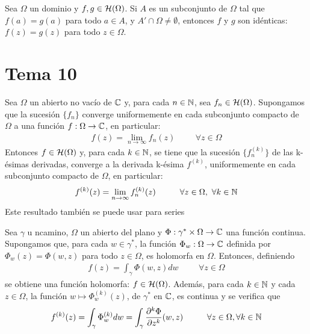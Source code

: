 \documentclass[12pt]{article}
\begin{document}
    \begin{prop} Sea $\Omega$ un dominio y $f,g\in \mathcal{H}(\Omega)$. Si $A$ es un subconjunto de $\Omega$ tal que $f(a) = g(a)$ para todo $a\in A$, y $A' \cap \Omega \neq \emptyset$, entonces $f$ y $g$ son idénticas: $f(z)=g(z)$ para todo $z\in \Omega$.
    \end{prop}

    \newpage

    \section{Tema 10}

    \begin{teo} Sea $\Omega$ un abierto no vacío de $\mathbb{C}$ y, para cada $n\in \mathbb{N}$, sea $f_n \in \mathcal{H}(\Omega)$. Supongamos que la sucesión $\{f_n\}$ converge uniformemente en cada subconjunto compacto de $\Omega$ a una función $f:\Omega \to \mathbb{C}$, en particular:
    \begin{gather*}
        f(z) = \lim_{n\to \infty} f_n(z) \hspace{1cm} \forall z \in \Omega
    \end{gather*}
    Entonces $f\in \mathcal{H}(\Omega)$ y, para cada $k\in \mathbb{N}$, se tiene que la sucesión $\{f^{(k)}_n\}$ de las k-ésimas derivadas, converge a la derivada k-ésima $f^{(k)}$, uniformemente en cada subconjunto compacto de $\Omega$, en particular:
    \begin{gather*}
        f^{(k)} (z) = \lim_{n\to \infty} f_n^{(k)} (z) \hspace{1cm} \forall z \in \Omega,\ \forall k \in \mathbb{N}
    \end{gather*}
    Este resultado también se puede usar para series
    \end{teo}

    \begin{teo}
        Sea $\gamma$ u ncamino, $\Omega$ un abierto del plano y $\Phi:\gamma^* \times \Omega \to \mathbb{C}$ una función continua. Supongamos que, para cada $w\in \gamma^*$, la función $\Phi_w:\Omega \to \mathbb{C}$ definida por $\Phi_w(z) = \Phi(w,z)$ para todo $z\in \Omega$, es holomorfa en $\Omega$. Entonces, definiendo
        \begin{gather*}
            f(z) = \int_\gamma \Phi(w,z) dw \hspace{1cm} \forall z \in \Omega
        \end{gather*}
        se obtiene una función holomorfa: $f \in \mathcal{H}(\Omega)$. Además, para cada $k\in \mathbb{N}$ y cada $z\in \Omega$, la función $w \mapsto \Phi_w ^{(k)}(z)$, de $\gamma^*$ en $\mathbb{C}$, es continua y se verifica que
        \begin{gather*}
            f^{(k)} (z) = \int_\gamma \Phi_w^{(k)} dw = \int_\gamma \frac{\partial^k \Phi}{\partial z^k}(w,z) \hspace{1cm} \forall z \in \Omega, \forall k \in \mathbb{N}
        \end{gather*}
    \end{teo}
\end{document}
